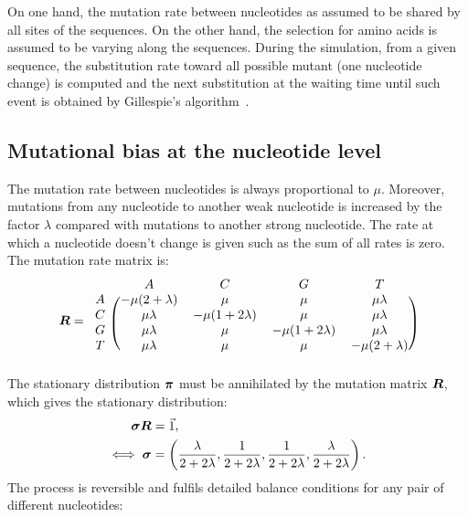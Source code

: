 On one hand, the mutation rate between nucleotides as assumed to be shared by all sites of the sequences.
On the other hand, the selection for amino acids is assumed to be varying along the sequences.
During the simulation, from a given sequence, the substitution rate toward all possible mutant (one nucleotide change) is computed and the next substitution at the waiting time until such event is obtained by Gillespie's algorithm~\citep{Gillespie1977}.

\subsection{Mutational bias at the nucleotide level}
\label{sec:mut-bias-mut-matrix}
The mutation rate between nucleotides is always proportional to $\mu$.
Moreover, mutations from any nucleotide to another weak nucleotide is increased by the factor $\lambda$ compared with mutations to another strong nucleotide.
The rate at which a nucleotide doesn't change is given such as the sum of all rates is zero.
The mutation rate matrix is:
\begin{equation}
    \label{nucMatrix}
    \Mutmatrix =
    \begin{blockarray}{ccccc}
        & A & C & G & T \\
        \begin{block}{c(cccc)}
            A & {-\mu(2 + \lambda)} & {\mu} & {\mu} & {\mu \lambda} \\
            C & {\mu \lambda} & {-\mu(1 + 2\lambda)} & {\mu} & {\mu \lambda} \\
            G & {\mu \lambda} & {\mu} & {-\mu(1 + 2\lambda)} & {\mu \lambda} \\
            T & {\mu \lambda} & {\mu} & {\mu} & {-\mu(2 + \lambda)} \\
        \end{block}
    \end{blockarray}
\end{equation}
The stationary distribution $ \bm{\pi}$ must be annihilated by the mutation matrix $\bm{R}$, which gives the stationary distribution:
\begin{align}
    \bm{\sigma} \bm{R} & = \vec{1}, \\
    \iff \bm{\sigma} & = \left( \dfrac{\lambda}{2+2\lambda}, \dfrac{1}{2+2\lambda}, \dfrac{1}{2+2\lambda}, \dfrac{\lambda}{2+2\lambda} \right).
    \label{nucStationarity}
\end{align}
The process is reversible and fulfils detailed balance conditions for any pair of different nucleotides:
